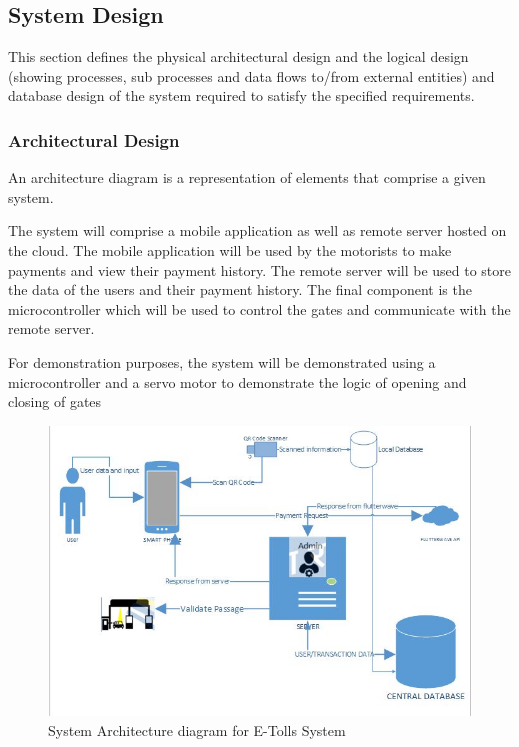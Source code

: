 \subsection{System Design}
This section defines the physical architectural design and the logical design (showing processes, sub processes and data flows to/from external entities) and database design of the system required to satisfy the specified requirements.

\subsubsection{Architectural Design}
An architecture diagram is a representation of elements that comprise a given system\cite{tilley2019systems}.

The system will comprise a mobile application as well as remote server hosted on the cloud. The mobile application will be used by the motorists to make payments and view their payment history. The remote server will be used to store the data of the users and their payment history. The final component is the microcontroller which will be used to control the gates and communicate with the remote server.

For demonstration purposes, the system will be demonstrated using a microcontroller and a servo motor to demonstrate the logic of opening and closing of gates


\begin{figure}[h]
    \begin{center}
        \includegraphics[scale = 0.8]{images/etolssys}
        \caption{System Architecture diagram for E-Tolls System}
    \end{center}
\end{figure}

